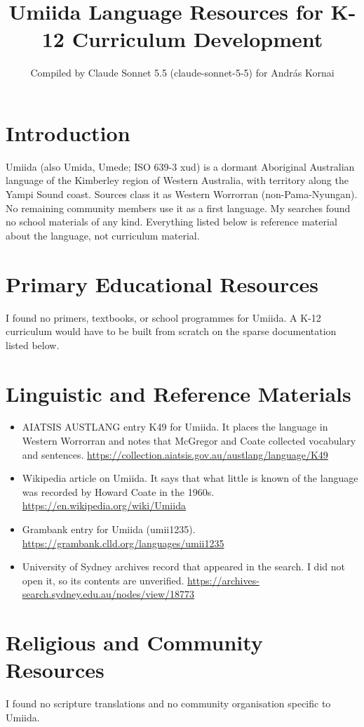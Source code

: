 \documentclass[12pt]{article}
\title{Umiida Language Resources for K-12 Curriculum Development}
\author{Compiled by Claude Sonnet 5.5 (claude-sonnet-5-5) for Andr\'as Kornai}
\date{}
\begin{document}
\maketitle

\section{Introduction}
Umiida (also Umida, Umede; ISO 639-3 xud) is a dormant Aboriginal Australian language of the Kimberley region of Western Australia, with territory along the Yampi Sound coast. Sources class it as Western Worrorran (non-Pama-Nyungan). No remaining community members use it as a first language. My searches found no school materials of any kind. Everything listed below is reference material about the language, not curriculum material.

\section{Primary Educational Resources}
I found no primers, textbooks, or school programmes for Umiida. A K-12 curriculum would have to be built from scratch on the sparse documentation listed below.

\section{Linguistic and Reference Materials}
\begin{itemize}
\item AIATSIS AUSTLANG entry K49 for Umiida. It places the language in Western Worrorran and notes that McGregor and Coate collected vocabulary and sentences. \url{https://collection.aiatsis.gov.au/austlang/language/K49}
\item Wikipedia article on Umiida. It says that what little is known of the language was recorded by Howard Coate in the 1960s. \url{https://en.wikipedia.org/wiki/Umiida}
\item Grambank entry for Umiida (umii1235). \url{https://grambank.clld.org/languages/umii1235}
\item University of Sydney archives record that appeared in the search. I did not open it, so its contents are unverified. \url{https://archives-search.sydney.edu.au/nodes/view/18773}
\end{itemize}

\section{Religious and Community Resources}
I found no scripture translations and no community organisation specific to Umiida.
\end{document}
